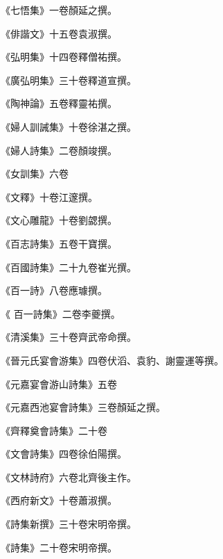 \begin{pinyinscope}
 《七悟集》一卷顏延之撰。



 《俳諧文》十五卷袁淑撰。



 《弘明集》十四卷釋僧祐撰。



 《廣弘明集》三十卷釋道宣撰。



 《陶神論》五卷釋靈祐撰。



 《婦人訓誡集》十卷徐湛之撰。



 《婦人詩集》二卷顏竣撰。



 《女訓集》六卷



 《文釋》十卷江邃撰。



 《文心雕龍》十卷劉勰撰。



 《百志詩集》五卷干寶撰。



 《百國詩集》二十九卷崔光撰。



 《百一詩》八卷應璩撰。



 《
 百一詩集》二卷李夔撰。



 《清溪集》三十卷齊武帝命撰。



 《晉元氏宴會游集》四卷伏滔、袁豹、謝靈運等撰。



 《元嘉宴會游山詩集》五卷



 《元嘉西池宴會詩集》三卷顏延之撰。



 《齊釋奠會詩集》二十卷



 《文會詩集》四卷徐伯陽撰。



 《文林詩府》六卷北齊後主作。



 《西府新文》十卷蕭淑撰。



 《詩集新撰》三十卷宋明帝撰。



 《詩集》二十卷宋明帝撰。




\end{pinyinscope}
